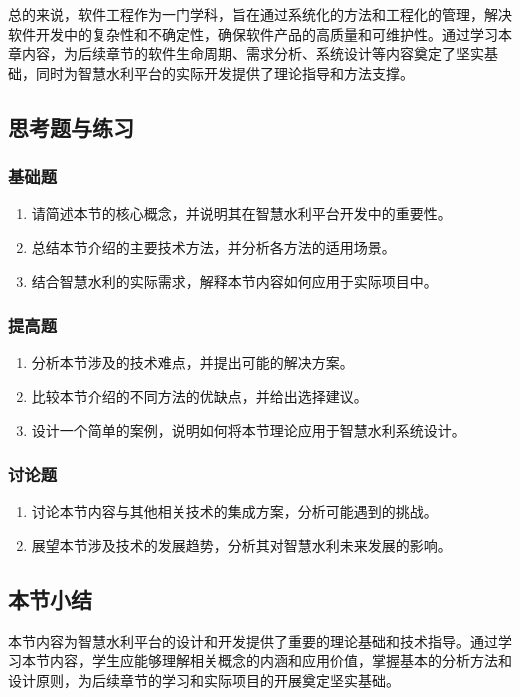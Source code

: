 总的来说，软件工程作为一门学科，旨在通过系统化的方法和工程化的管理，解决软件开发中的复杂性和不确定性，确保软件产品的高质量和可维护性。通过学习本章内容，为后续章节的软件生命周期、需求分析、系统设计等内容奠定了坚实基础，同时为智慧水利平台的实际开发提供了理论指导和方法支撑。

\hypertarget{ux601dux8003ux9898ux4e0eux7ec3ux4e60-2}{%
\subsection{思考题与练习}\label{ux601dux8003ux9898ux4e0eux7ec3ux4e60-2}}

\hypertarget{ux57faux7840ux9898-2}{%
\subsubsection{基础题}\label{ux57faux7840ux9898-2}}

\begin{enumerate}
\def\labelenumi{\arabic{enumi}.}
\tightlist
\item
  请简述本节的核心概念，并说明其在智慧水利平台开发中的重要性。
\item
  总结本节介绍的主要技术方法，并分析各方法的适用场景。
\item
  结合智慧水利的实际需求，解释本节内容如何应用于实际项目中。
\end{enumerate}

\hypertarget{ux63d0ux9ad8ux9898-2}{%
\subsubsection{提高题}\label{ux63d0ux9ad8ux9898-2}}

\begin{enumerate}
\def\labelenumi{\arabic{enumi}.}
\tightlist
\item
  分析本节涉及的技术难点，并提出可能的解决方案。
\item
  比较本节介绍的不同方法的优缺点，并给出选择建议。
\item
  设计一个简单的案例，说明如何将本节理论应用于智慧水利系统设计。
\end{enumerate}

\hypertarget{ux8ba8ux8bbaux9898-2}{%
\subsubsection{讨论题}\label{ux8ba8ux8bbaux9898-2}}

\begin{enumerate}
\def\labelenumi{\arabic{enumi}.}
\tightlist
\item
  讨论本节内容与其他相关技术的集成方案，分析可能遇到的挑战。
\item
  展望本节涉及技术的发展趋势，分析其对智慧水利未来发展的影响。
\end{enumerate}

\hypertarget{ux672cux8282ux5c0fux7ed3-2}{%
\subsection{本节小结}\label{ux672cux8282ux5c0fux7ed3-2}}

本节内容为智慧水利平台的设计和开发提供了重要的理论基础和技术指导。通过学习本节内容，学生应能够理解相关概念的内涵和应用价值，掌握基本的分析方法和设计原则，为后续章节的学习和实际项目的开展奠定坚实基础。